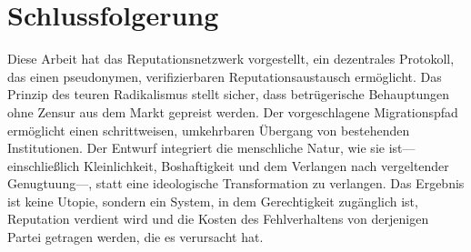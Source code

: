 \documentclass[11pt,a4paper,twocolumn]{article}
\begin{document}
\section{Schlussfolgerung}

Diese Arbeit hat das Reputationsnetzwerk vorgestellt, ein dezentrales Protokoll, das einen pseudonymen, verifizierbaren Reputationsaustausch ermöglicht. Das Prinzip des teuren Radikalismus stellt sicher, dass betrügerische Behauptungen ohne Zensur aus dem Markt gepreist werden. Der vorgeschlagene Migrationspfad ermöglicht einen schrittweisen, umkehrbaren Übergang von bestehenden Institutionen. Der Entwurf integriert die menschliche Natur, wie sie ist---einschließlich Kleinlichkeit, Boshaftigkeit und dem Verlangen nach vergeltender Genugtuung---, statt eine ideologische Transformation zu verlangen. Das Ergebnis ist keine Utopie, sondern ein System, in dem Gerechtigkeit zugänglich ist, Reputation verdient wird und die Kosten des Fehlverhaltens von derjenigen Partei getragen werden, die es verursacht hat.


\end{document}
